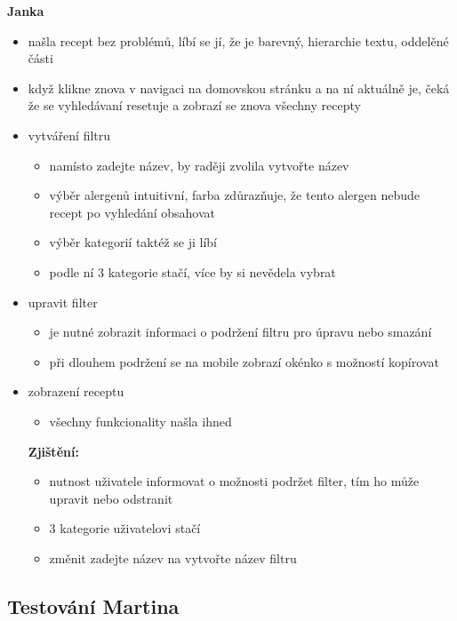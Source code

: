 \documentclass[a4paper, 11pt]{article}
\begin{document}
\noindent\textbf{Janka} \\[-1em]
\begin{itemize}
    \item našla recept bez problémů, líbí se jí, že je barevný, hierarchie textu, oddelěné části
    \item když klikne znova v navigaci na domovskou stránku a na ní aktuálně je, čeká že se vyhledávaní resetuje a zobrazí se znova všechny recepty
    \item vytváření filtru
        \begin{itemize}
            \item namísto zadejte název, by raději zvolila vytvořte název 
            \item výběr alergenů intuitivní, farba zdůrazňuje, že tento alergen nebude recept po vyhledání obsahovat
            \item výběr kategorií taktéž se ji líbí
            \item podle ní 3 kategorie stačí, více by si nevědela vybrat
        \end{itemize}
    \item upravit filter
        \begin{itemize}
            \item je nutné zobrazit informaci o podržení filtru pro úpravu nebo smazání
            \item při dlouhem podržení se na mobile zobrazí okénko s možností kopírovat
        \end{itemize}
    \item zobrazení receptu
        \begin{itemize}
            \item všechny funkcionality našla ihned
        \end{itemize}

    \textbf{Zjištění:}
        \begin{itemize}
            \item nutnost uživatele informovat o možnosti podržet filter, tím ho může upravit nebo odstranit
            \item 3 kategorie uživatelovi stačí
            \item změnit zadejte název na vytvořte název filtru
    \end{itemize}
\end{itemize}

\subsection{Testování Martina}
\end{document}
